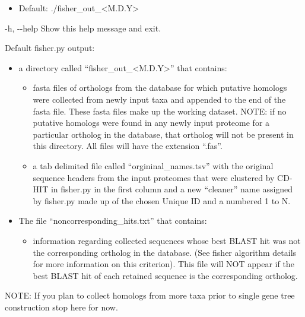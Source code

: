 \documentclass{article}
\begin{document}
\begin{enumerate}[itemsep=12pt]
\begin{description}
\begin{description}
                \begin{itemize}
                    \item Default: ./fisher\_out\_<M.D.Y>
                \end{itemize}
                \item -h, -\/-help \hspace{0.2cm} Show this help message and exit.
            \end{description}
        \vspace{0.2cm}    
        \item Default fisher.py output:
            \begin{itemize}
                \item a directory called “fisher\_out\_<M.D.Y>” that contains:
                \begin{itemize}
                    \item fasta files of orthologs from the database for which putative homologs were collected from newly input taxa and appended to the end of the fasta file. These fasta files make up the working dataset. NOTE: if no putative homologs were found in any newly input proteome for a particular ortholog in the database, that ortholog will not be present in this directory. All files will have the extension “.fas”.
                    \item a tab delimited file called “orgininal\_names.tsv” with the original sequence headers from the input proteomes that were clustered by CD-HIT in fisher.py in the first column and a new “cleaner” name assigned by fisher.py made up of the chosen Unique ID and a numbered 1  to N.
                \end{itemize}
            \item The file “noncorresponding\_hits.txt” that contains:
                \begin{itemize}
                    \item information regarding collected sequences whose best BLAST hit was not the corresponding ortholog in the database. (See fisher algorithm details for more information on this criterion). This file will NOT appear if the best BLAST hit of each retained sequence is the corresponding ortholog.
                \end{itemize}
            \end{itemize}
            \vspace{0.5cm}
            NOTE: If you plan to collect homologs from more taxa prior to single gene tree construction stop here for now.
        \end{description}
        

\end{enumerate}
\end{document}
